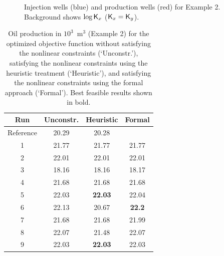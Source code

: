\documentclass[twocolumn,numbook]{svjour3}          %
\begin{document}
\begin{figure}[ht]
\begin{center}

\end{center}
     \caption{Injection wells (blue) and production wells (red) for Example 2. Background shows $\log \mathsf{K}_x$ ($ \mathsf{K}_x = \mathsf{K}_y$).}
  \label{fig:PermeabilityMapAndWellsSpe10Top}
\end{figure}
%

\begin{table}
\centering
\caption{Oil production in $10^3$~m$^3$ (Example 2) for the optimized objective function
         without satisfying the nonlinear constraints (`Unconstr.'), satisfying the nonlinear constraints
         using the heuristic treatment (`Heuristic'), and satisfying the nonlinear constraints
         using the formal approach (`Formal'). Best feasible results shown in bold.}
\begin{tabular}{|c|c|c|c|}
\hline
  Run            &  Unconstr. & Heuristic & Formal      \\
\hline
Reference        & 20.29         &     20.28         & 	         \\
1 & 21.77      &     21.77         &       21.77    \\
2 & 22.01      &     22.01         &       22.01    \\
3 & 18.16      &     18.16         &       18.17    \\
4 & 21.68      &     21.68         &       21.68    \\
5 & 22.03      & \bf{22.03}      &       22.04    \\
6 & 22.13      &     20.67         &  \bf{22.2}    \\
7 & 21.68      &     21.68         &       21.99    \\
8 & 22.07      &     21.48         &       22.07    \\
9 & 22.03      & \bf{22.03}      &       22.03    \\
\hline
\end{tabular}
  \label{table:spe10top}
\end{table}

\end{document}
